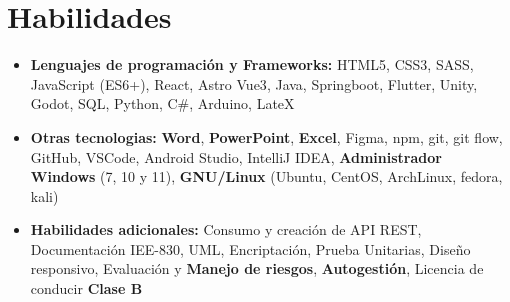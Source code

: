 \documentclass[11pt,a4paper,sans]{moderncv}
\newcommand{\sectionMargin}{-3mm}
\begin{document}
\section{Habilidades}{
    \begin{itemize}[label=\textbullet, noitemsep]
        \item {\textbf{Lenguajes de programación y Frameworks:}
            {HTML5},
            {CSS3},
            {SASS},
            {JavaScript (ES6+)},
            {React},
            {Astro}
            {Vue3},
            {Java},
            {Springboot},
            {Flutter},
            {Unity},
            {Godot},
            {SQL},
            {Python},
            {C\#},
            {Arduino},
            {LateX}
        }
        
        \item {\textbf{Otras tecnologias:}
            \textbf{Word},
            \textbf{PowerPoint},
            \textbf{Excel}, 
            {Figma},
            {npm},
            {git},
            {git flow},
            {GitHub},
            {VSCode},
            {Android Studio},
            {IntelliJ IDEA},
            \textbf{Administrador Windows} (7, 10 y 11),
            \textbf{GNU/Linux} (Ubuntu, CentOS, ArchLinux, fedora, kali)
        }
        \item {\textbf{Habilidades adicionales:} 
            Consumo y creación de {API REST},
            {Documentación IEE-830},
            {UML},
            {Encriptación},
            {Prueba Unitarias},
            {Diseño responsivo},
            Evaluación y  \textbf{Manejo de riesgos},  
            \textbf{Autogestión}, 
            Licencia de conducir \textbf{Clase B}
        }
    \end{itemize}
}

\vspace*{\sectionMargin}
\end{document}
